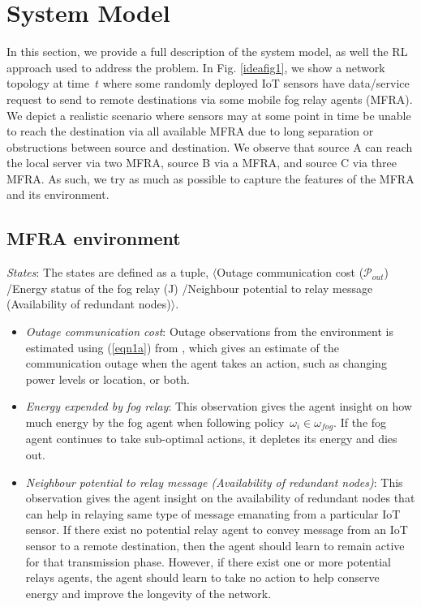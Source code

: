 \documentclass[journal]{IEEEtran}
\begin{document}
\section{System Model}
In this section, we provide a full description of the system model, as well the RL approach used to address the problem. In Fig. \ref{ideafig1}, we show a network topology at time~$t$ where some randomly deployed IoT sensors have data/service request to send to remote destinations via some mobile fog relay agents (MFRA). We depict a realistic scenario where sensors may at some point in time be unable to reach the destination via all available MFRA due to long separation or obstructions between source and destination. We observe that source A can reach the local server via two MFRA, source B via a MFRA, and source C via three MFRA. As such, we try as much as possible to capture the features of the MFRA and its environment.

\subsection{MFRA environment}
\emph{States}: The states are defined as a tuple, $\langle$Outage communication cost ($\mathcal{P}_{out}$) /Energy status of the fog relay (J) /Neighbour potential to relay message (Availability of redundant nodes)$\rangle$.

\begin{itemize}
  \item \emph{Outage communication cost}: Outage observations from the environment is estimated using (\ref{eqn1a}) from \cite{OmoniwaRelay2018}, which gives an estimate of the communication outage when the agent takes an action, such as changing power levels or location, or both.
  \item \emph{Energy expended by fog relay}: This observation gives the agent insight on how much energy by the fog agent when following policy~$\omega_i \in \omega_{fog}$. If the fog agent continues to take sub-optimal actions, it depletes its energy and dies out.
  \item \emph{Neighbour potential to relay message (Availability of redundant nodes)}: This observation gives the agent insight on the availability of redundant nodes that can help in relaying same type of message emanating from a particular IoT sensor. If there exist no potential relay agent to convey message from an IoT sensor to a remote destination, then the agent should learn to remain active for that transmission phase. However, if there exist one or more potential relays agents, the agent should learn to take no action to help conserve energy and improve the longevity of the network.
\end{itemize}
\end{document}
